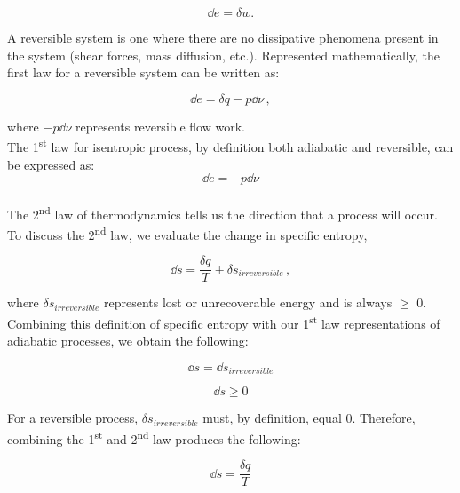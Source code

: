 \documentclass[12pt,letterpaper]{article}
\begin{document}
\begin{enumerate}[label=(\alph*)]
\begin{enumerate}[label=\arabic*.]
					\begin{equation*}
						\dd e = \delta w.
					\end{equation*}
					
					A reversible system is one where there are no dissipative phenomena present in the system (shear forces, mass diffusion, etc.). Represented mathematically, the first law for a reversible system can be written as:
					
					\begin{equation*}
						\dd e = \delta q - p\dd \nu\,,
					\end{equation*}			
						
					where $-p\dd \nu$ represents reversible flow work. \\
					
					The 1\textsuperscript{st} law for isentropic process, by definition both adiabatic and reversible, can be expressed as:
					\begin{equation*}
						\dd e = -p\dd \nu
					\end{equation*}
					\medskip
					\\
					
					The 2\textsuperscript{nd} law of thermodynamics tells us the direction that a process will occur. To discuss the 2\textsuperscript{nd} law, we evaluate the change in specific entropy,
					
					\begin{equation*}
						\dd s = \frac{\delta q}{T} + \delta s_{irreversible}\,,
					\end{equation*}
				
					
					where $\delta s_{irreversible}$ represents lost or unrecoverable energy and is always $\ge$ 0. Combining this definition of specific entropy with our 1\textsuperscript{st} law representations of adiabatic processes, we obtain the following:
					
					\begin{equation*}
						\dd s = \dd s_{irreversible}
					\end{equation*}
					
					\begin{equation*}
						\dd s \ge 0
					\end{equation*}
					
					For a reversible process, $\delta s_{irreversible}$ must, by definition, equal 0. Therefore, combining the 1\textsuperscript{st} and 2\textsuperscript{nd} law produces the following:
					
					\begin{equation*}
						\dd s = \frac{\delta q}{T}
					\end{equation*}
					

\end{enumerate}
\end{enumerate}
\end{document}
